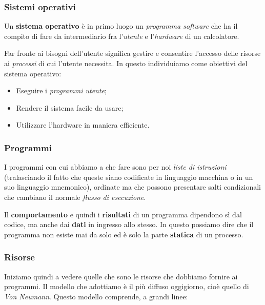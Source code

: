 \documentclass[a4paper,11pt]{article}
\begin{document}
\subsubsection{Sistemi operativi}
Un \textbf{sistema operativo} è in primo luogo un \textit{programma software} che ha il compito di fare da intermediario fra l'\textit{utente} e l'\textit{hardware} di un calcolatore.

Far fronte ai bisogni dell'utente significa gestire e consentire l'accesso delle risorse ai \textit{processi} di cui l'utente necessita. In questo individuiamo come obiettivi del sistema operativo:
\begin{itemize}
	\item Eseguire i \textit{programmi utente};
	\item Rendere il sistema facile da usare;
	\item Utilizzare l'hardware in maniera efficiente.
\end{itemize}

\subsubsection{Programmi}
I programmi con cui abbiamo a che fare sono per noi \textit{liste di istruzioni} (tralasciando il fatto che queste siano codificate in linguaggio macchina o in un suo linguaggio mnemonico), ordinate ma che possono presentare salti condizionali che cambiano il normale \textit{flusso di esecuzione}.

Il \textbf{comportamento} e quindi i \textbf{risultati} di un programma dipendono sì dal codice, ma anche dai \textbf{dati} in ingresso allo stesso.
In questo possiamo dire che il programma non esiste mai da solo ed è solo la parte \textbf{statica} di un processo.

\subsubsection{Risorse}
Iniziamo quindi a vedere quelle che sono le risorse che dobbiamo fornire ai programmi. Il modello che adottiamo è il più diffuso oggigiorno, cioè quello di \textit{Von Neumann}.
Questo modello comprende, a grandi linee:
\end{document}
